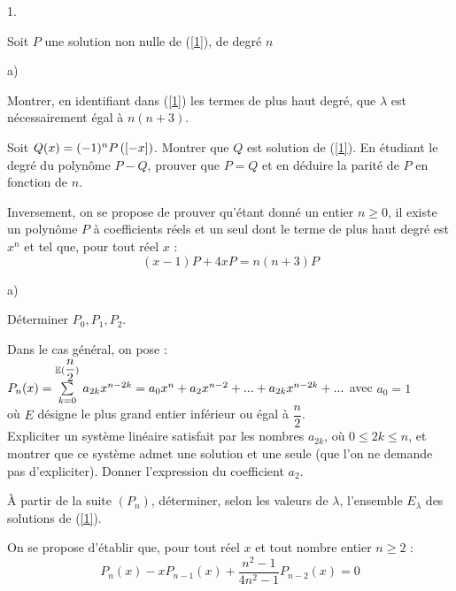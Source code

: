 \documentclass[11pt]{article}%
\begin{document}
\begin{noliste}{1.}
 \setlength{\itemsep}{4mm}
\item Soit $P$ une solution non nulle de (\ref{1}), de degré $n$

\begin{noliste}{a)}
 \setlength{\itemsep}{2mm}
\item Montrer, en identifiant dans (\ref{1}) les termes de plus haut
degré,
que $\lambda $ est nécessairement égal à $n(n + 3)$.

\item Soit $Q(x) = (-1)^{n}P\left(\left[ {-x} \right]\right)$. Montrer que $Q$ est
solution de (\ref{1}).
En étudiant le degré du polynôme $P-Q$, prouver que $P = Q$ et en
déduire la
parité de $P$ en fonction de $n$.
\end{noliste}

\item Inversement, on se propose de prouver qu'étant donné un entier
$n\geq 0$, il existe un polynôme $P$ à coefficients réels et un seul
dont le terme de plus haut degré est $x^{n}$ et tel que, pour tout réel
$x$ :\begin{equation}
(x-1)P + 4xP = n(n + 3)P \label{2}
\end{equation}

\begin{noliste}{a)}
 \setlength{\itemsep}{2mm}
\item Déterminer $P_{0},P_{1},P_{2}${\small.}

\item Dans le cas général, on pose : $P_{n}(x) = {\textstyle\sum\limits_{k =
0}^{\mathbb{E}(\dfrac{n}{2})}}\hspace{.1cm}a_{2k}x^{n-2k} = a_{0}x^{n} + a_{2}x^{n-2} +... +
a_{2k}x^{n-2k} +...$ avec $a_{0} = 1$\\
où $E$ désigne le plus grand entier inférieur ou égal à
$\dfrac{n}{2}$.\\
Expliciter un système linéaire satisfait par les nombres $a_{2k}$, où
$0\leq 2k\leq n$, et montrer que ce système admet une solution et
une seule (que l'on ne demande pas d'expliciter). Donner l'expression
du
coefficient $a_{2}$.
\end{noliste}

\item À partir de la suite $(P_{n})$, déterminer, selon les valeurs de
$\lambda $, l'ensemble $E_{\lambda }$ des solutions de (\ref{1}).

\item On se propose d'établir que, pour tout réel $x$ et tout nombre
entier $n\geq 2$ :\begin{equation}
P_{n}(x)-xP_{n-1}(x) + \dfrac{n^{2}-1}{4n^{2}-1}P_{n-2}(x) = 0
\label{3}
\end{equation}


\end{noliste}
\end{document}
